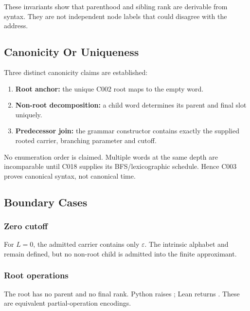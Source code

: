 These invariants show that parenthood and sibling rank are derivable
from syntax. They are not independent node labels that could disagree
with the address.

\subsection{Canonicity Or Uniqueness}\label{canonicity-or-uniqueness-1}

Three distinct canonicity claims are established:

\begin{enumerate}
\def\labelenumi{\arabic{enumi}.}
\tightlist
\item
  \textbf{Root anchor:} the unique C002 root maps to the empty word.
\item
  \textbf{Non-root decomposition:} a child word determines its parent
  and final slot uniquely.
\item
  \textbf{Predecessor join:} the grammar constructor contains exactly
  the supplied rooted carrier, branching parameter and cutoff.
\end{enumerate}

No enumeration order is claimed. Multiple words at the same depth are
incomparable until C018 supplies its BFS/lexicographic schedule. Hence
C003 proves canonical syntax, not canonical time.

\subsection{Boundary Cases}\label{boundary-cases-1}

\subsubsection{Zero cutoff}\label{zero-cutoff}

For \(L=0\), the admitted carrier contains only \(\varepsilon\). The
intrinsic alphabet and \texttt{\protect{}} remain defined, but no
non-root child is admitted into the finite approximant.

\subsubsection{Root operations}\label{root-operations}

The root has no parent and no final rank. Python raises
\texttt{\protect{}}; Lean returns \texttt{\protect{}}. These are equivalent
partial-operation encodings.

